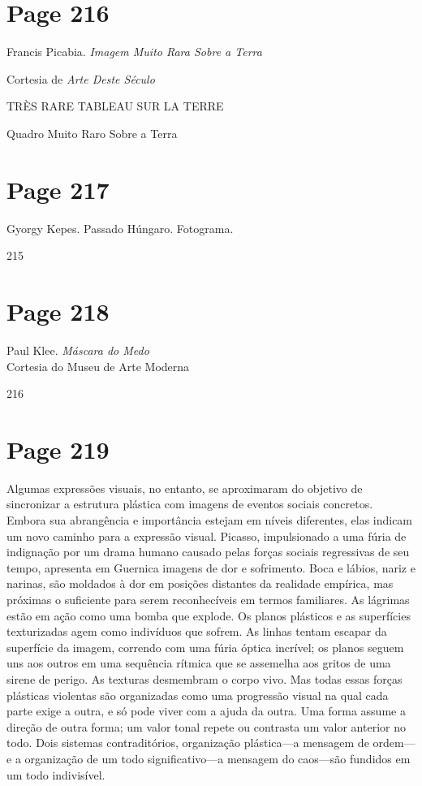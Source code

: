 \documentclass[a4paper]{article}
\begin{document}
\section*{Page 216}

Francis Picabia. \textit{Imagem Muito Rara Sobre a Terra}

Cortesia de \textit{Arte Deste Século}

TRÈS RARE TABLEAU SUR LA TERRE

Quadro Muito Raro Sobre a Terra

\newpage
\section*{Page 217}

Gyorgy Kepes. Passado Húngaro. Fotograma.

215

\newpage
\section*{Page 218}

Paul Klee. \textit{Máscara do Medo}\\
Cortesia do Museu de Arte Moderna

216

\newpage
\section*{Page 219}

\noindent Algumas expressões visuais, no entanto, se aproximaram do objetivo de sincronizar a estrutura plástica com imagens de eventos sociais concretos. Embora sua abrangência e importância estejam em níveis diferentes, elas indicam um novo caminho para a expressão visual. Picasso, impulsionado a uma fúria de indignação por um drama humano causado pelas forças sociais regressivas de seu tempo, apresenta em Guernica imagens de dor e sofrimento. Boca e lábios, nariz e narinas, são moldados à dor em posições distantes da realidade empírica, mas próximas o suficiente para serem reconhecíveis em termos familiares. As lágrimas estão em ação como uma bomba que explode. Os planos plásticos e as superfícies texturizadas agem como indivíduos que sofrem. As linhas tentam escapar da superfície da imagem, correndo com uma fúria óptica incrível; os planos seguem uns aos outros em uma sequência rítmica que se assemelha aos gritos de uma sirene de perigo. As texturas desmembram o corpo vivo. Mas todas essas forças plásticas violentas são organizadas como uma progressão visual na qual cada parte exige a outra, e só pode viver com a ajuda da outra. Uma forma assume a direção de outra forma; um valor tonal repete ou contrasta um valor anterior no todo. Dois sistemas contraditórios, organização plástica---a mensagem de ordem---e a organização de um todo significativo---a mensagem do caos---são fundidos em um todo indivisível.
\end{document}
